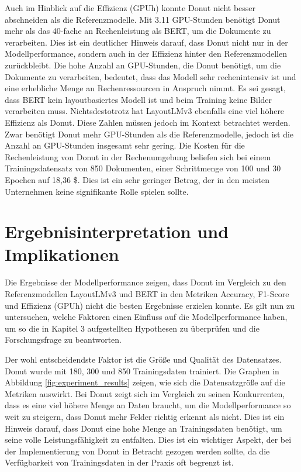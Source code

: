 Auch im Hinblick auf die Effizienz (GPUh) konnte Donut nicht besser abschneiden als die Referenzmodelle. Mit 3.11 GPU-Stunden benötigt Donut mehr als das 40-fache an Rechenleistung als BERT, um die Dokumente zu verarbeiten. Dies ist ein deutlicher Hinweis darauf, dass Donut nicht nur in der Modellperformance, sondern auch in der Effizienz hinter den Referenzmodellen zurückbleibt. Die hohe Anzahl an GPU-Stunden, die Donut benötigt, um die Dokumente zu verarbeiten, bedeutet, dass das Modell sehr rechenintensiv ist und eine erhebliche Menge an Rechenressourcen in Anspruch nimmt. Es sei gesagt, dass BERT kein layoutbasiertes Modell ist und beim Training keine Bilder verarbeiten muss. Nichtsdestotrotz hat LayoutLMv3 ebenfalls eine viel höhere Effizienz als Donut. Diese Zahlen müssen jedoch im Kontext betrachtet werden. Zwar benötigt Donut mehr GPU-Stunden als die Referenzmodelle, jedoch ist die Anzahl an GPU-Stunden insgesamt sehr gering. Die Kosten für die Rechenleistung von Donut in der Rechenumgebung beliefen sich bei einem Trainingsdatensatz von 850 Dokumenten, einer Schrittmenge von 100 und 30 Epochen auf 18,36 \$. Dies ist ein sehr geringer Betrag, der in den meisten Unternehmen keine signifikante Rolle spielen sollte.

\section{Ergebnisinterpretation und Implikationen}
Die Ergebnisse der Modellperformance zeigen, dass Donut im Vergleich zu den Referenzmodellen LayoutLMv3 und BERT in den Metriken Accuracy, F1-Score und Effizienz (GPUh) nicht die besten Ergebnisse erzielen konnte. Es gilt nun zu untersuchen, welche Faktoren einen Einfluss auf die Modellperformance haben, um so die in Kapitel 3 aufgestellten Hypothesen zu überprüfen und die Forschungsfrage zu beantworten.

Der wohl entscheidendste Faktor ist die Größe und Qualität des Datensatzes. Donut wurde mit 180, 300 und 850 Trainingsdaten trainiert. Die Graphen in Abbildung \ref{fig:experiment_results} zeigen, wie sich die Datensatzgröße auf die Metriken auswirkt. Bei Donut zeigt sich im Vergleich zu seinen Konkurrenten, dass es eine viel höhere Menge an Daten braucht, um die Modellperformance so weit zu steigern, dass Donut mehr Felder richtig erkennt als nicht. Dies ist ein Hinweis darauf, dass Donut eine hohe Menge an Trainingsdaten benötigt, um seine volle Leistungsfähigkeit zu entfalten. Dies ist ein wichtiger Aspekt, der bei der Implementierung von Donut in Betracht gezogen werden sollte, da die Verfügbarkeit von Trainingsdaten in der Praxis oft begrenzt ist. 
    
